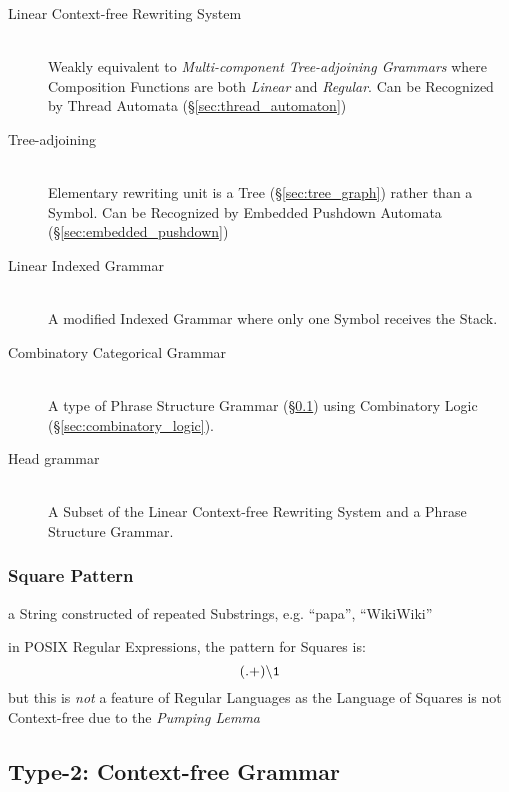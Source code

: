 \begin{description}
\item[Linear Context-free Rewriting System] \hfill \\
  Weakly equivalent to \emph{Multi-component Tree-adjoining Grammars}
  where Composition Functions are both \emph{Linear} and
  \emph{Regular}. Can be Recognized by Thread Automata
  (\S\ref{sec:thread_automaton})\cite{villemonte02}

\item[Tree-adjoining] \hfill \\
  Elementary rewriting unit is a Tree (\S\ref{sec:tree_graph}) rather
  than a Symbol. Can be Recognized by Embedded Pushdown Automata
  (\S\ref{sec:embedded_pushdown})\cite{vijayashanker88}

\item[Linear Indexed Grammar] \hfill \\
  A modified Indexed Grammar where only one Symbol receives the
  Stack.

\item[Combinatory Categorical Grammar] \hfill \\
  A type of Phrase Structure Grammar (\S\ref{sec:context_free}) using
  Combinatory Logic (\S\ref{sec:combinatory_logic}).

\item[Head grammar] \hfill \\
  A Subset of the Linear Context-free Rewriting System and a Phrase
  Structure Grammar.
\end{description}



\subsubsection{Square Pattern}\label{subsubsection:square_pattern}

a String constructed of repeated Substrings, e.g. ``papa'',
``WikiWiki''

in POSIX Regular Expressions, the pattern for Squares is:
\[ \mathtt{(.+)\backslash1} \]
but this is \emph{not} a feature of Regular Languages as the Language
of Squares is not Context-free due to the \emph{Pumping Lemma}



\subsection{Type-2: Context-free Grammar}\label{sec:context_free}

